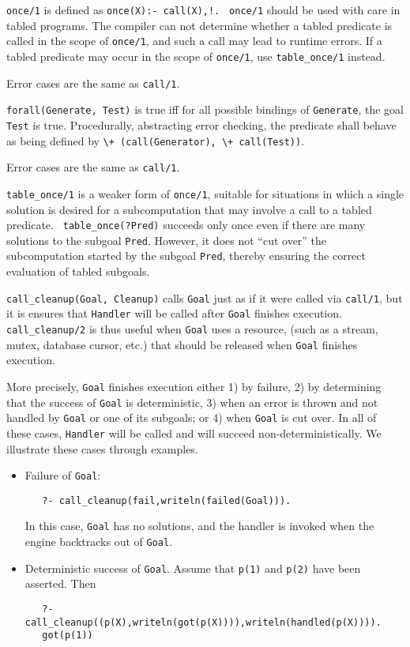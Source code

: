 \begin{description}
\begin{itemize}
%
    {\tt once/1} is defined as {\tt once(X):- call(X),!.}  {\tt
    once/1} should be used with care in tabled programs.  The compiler
    can not determine whether a tabled predicate is called in the
    scope of {\tt once/1}, and such a call may lead to runtime errors.
    If a tabled predicate may occur in the scope of {\tt once/1}, use
    {\tt table\_once/1} instead.

    Error cases are the same as {\tt call/1}.

%
{\tt forall(Generate, Test)} is true iff for all possible bindings of
{\tt Generate}, the goal {\tt Test} is true. Procedurally, abstracting
error checking, the predicate shall behave as being defined by 
\verb|\+ (call(Generator), \+ call(Test))|.

    Error cases are the same as {\tt call/1}.

    {\tt table\_once/1} is a weaker form of {\tt once/1}, suitable for
    situations in which a single solution is desired for a
    subcomputation that may involve a call to a tabled predicate.  {\tt
    table\_once(?Pred)} succeeds only once even if there are many
    solutions to the subgoal {\tt Pred}.  However, it does not ``cut
    over'' the subcomputation started by the subgoal {\tt Pred},
    thereby ensuring the correct evaluation of tabled subgoals.

%
{\tt call\_cleanup(Goal, Cleanup)} calls {\tt Goal} just as if it were
called via {\tt call/1}, but it is ensures that {\tt Handler} will be
called after {\tt Goal} finishes execution.  {\tt call\_cleanup/2} is
thus useful when {\tt Goal} uses a resource, (such as a stream, mutex,
database cursor, etc.) that should be released when {\tt Goal}
finishes execution.

More precisely, {\tt Goal} finishes execution either 1) by failure, 2)
by determining that the success of {\tt Goal} is deterministic, 3)
when an error is thrown and not handled by {\tt Goal} or one of its
subgoals; or 4) when {\tt Goal} is cut over.  In all of these cases,
{\tt Handler} will be called and will succeed non-deterministically.
We illustrate these cases through examples.
\begin{itemize}
\item Failure of {\tt Goal}:
\begin{verbatim}
   ?- call_cleanup(fail,writeln(failed(Goal))).
\end{verbatim}
In this case, {\tt Goal} has no solutions, and the handler is invoked
when the engine backtracks out of {\tt Goal}.
%
\item Deterministic success of {\tt Goal}.  Assume that {\tt p(1)} and
  {\tt p(2)} have been asserted.  Then
\begin{verbatim}
   ?- call_cleanup((p(X),writeln(got(p(X)))),writeln(handled(p(X)))).
   got(p(1))


\end{verbatim}
\end{itemize}
\end{itemize}
\end{description}
